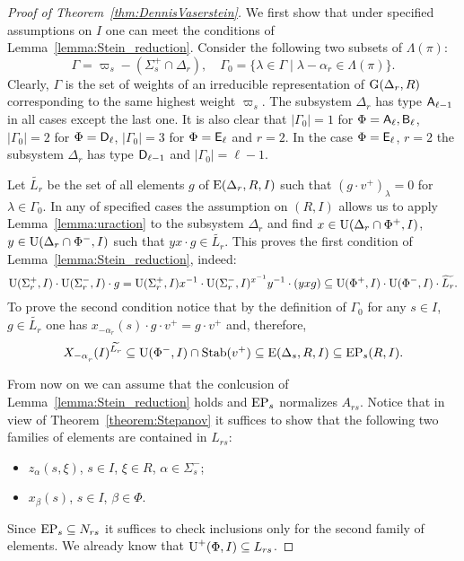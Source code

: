 \begin{proof}[Proof of Theorem~\ref{thm:DennisVaserstein}]
We first show that under specified assumptions on $I$ one can meet the conditions of Lemma~\ref{lemma:Stein_reduction}.
Consider the following two subsets of $\Lambda(\pi)$:
$$\Gamma = \varpi_s- (\Sigma_s^+\cap \Delta_r),\quad \Gamma_0 = \{\lambda \in \Gamma \mid \lambda - \alpha_r \in \Lambda(\pi) \}.$$
Clearly, $\Gamma$ is the set of weights of an irreducible representation of $\operatorname{G}(\Delta_r, R)$ corresponding to the same highest weight $\varpi_s$.
The subsystem $\Delta_r$ has type $\mathsf{A}_{\ell-1}$ in all cases except the last one.
It is also clear that $|\Gamma_0|=1$ for $\Phi=\mathsf{A}_\ell, \mathsf{B}_\ell$, $|\Gamma_0|=2$ for $\Phi=\mathsf{D}_\ell$, $|\Gamma_0|=3$ for $\Phi=\mathsf{E}_\ell$ and $r=2$.
In the case $\Phi=\mathsf{E}_\ell$, $r=2$ the subsystem $\Delta_r$ has type $\mathsf{D}_{\ell-1}$ and $|\Gamma_0|=\ell-1$.

Let $\widetilde{L_r}$ be the set of all elements $g$ of $\operatorname{E}(\Delta_r,R, I)$ such that $(g \cdot v^+)_\lambda = 0$ for $\lambda\in\Gamma_0$.
In any of specified cases the assumption on $(R, I)$ allows us to apply Lemma~\ref{lemma:uraction} to the subsystem $\Delta_r$ and find
$x\in\operatorname{U}(\Delta_r\cap\Phi^+, I)$, $y\in \operatorname{U}(\Delta_r\cap\Phi^-, I)$ such that $yx\cdot g \in \widetilde{L_r}$.
This proves the first condition of Lemma~\ref{lemma:Stein_reduction}, indeed:
$$ \operatorname{U}(\Sigma^+_r, I)\cdot \operatorname{U}(\Sigma^-_r, I) \cdot g = \operatorname{U}(\Sigma^+_r, I) x^{-1} \cdot \operatorname{U}(\Sigma^-_r, I)^{x^{-1}} y^{-1} \cdot (yxg) \subseteq \operatorname{U}(\Phi^+, I)\cdot \operatorname{U}(\Phi^-, I) \cdot \widetilde{L_r}.$$
To prove the second condition notice that by the definition of $\Gamma_0$ for any $s\in I$, $ g\in\widetilde{L_r}$ one has $x_{-\alpha_r}(s) \cdot g \cdot v^+ = g \cdot v^+$ and, therefore,
$$X_{-\alpha\ssub{r}}(I)^{\widetilde{L_r}} \subseteq \U(\Phi^-, I) \cap \Stab(v^+) \subseteq \E(\Delta_s, R, I) \subseteq \EP_s(R, I).$$

From now on we can assume that the conlcusion of Lemma~\ref{lemma:Stein_reduction} holds and $\operatorname{EP}_s$ normalizes $A_{rs}$.
Notice that in view of Theorem~\ref{theorem:Stepanov} it suffices to show that the following two families of elements are contained in $L_{rs}$:
\begin{itemize} \item $z_{\alpha}(s, \xi)$, $s\in I$, $\xi \in R$, $\alpha\in\Sigma^-_s$;
\item $x_{\beta}(s)$, $s \in I$, $\beta \in \Phi$. \end{itemize}
Since $\operatorname{EP}_s \subseteq N_{rs}$ it suffices to check inclusions only for the second family of elements.
We already know that $\operatorname{U}^+(\Phi, I) \subseteq L_{rs}$.


\end{proof}

